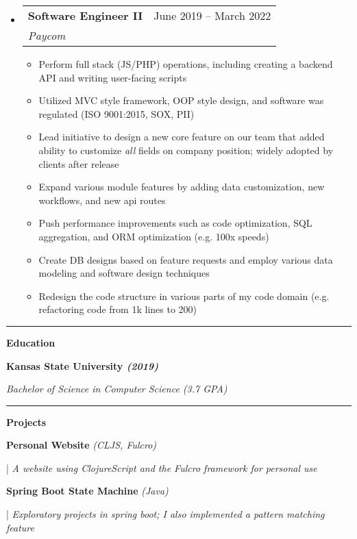 \documentclass[letterpaper,11pt]{article}
\makeatletter
\newcommand{\resumeItem}[1]{
  \item\small{
    {#1 \vspace{-2pt}}
  }
}
\newcommand{\resumeSubheading}[4]{
  \vspace{-2pt}\item
    \begin{tabular*}{0.97\textwidth}[t]{l@{\extracolsep{\fill}}r}
      \textbf{#1} & #2 \\
      \textit{\small#3} & \textit{\small #4} \\
    \end{tabular*}\vspace{0pt}
}
\newcommand{\resumeSubHeadingListStart}{\begin{itemize}[leftmargin=0.15cm, label={}]}
\newcommand{\resumeSubHeadingListEnd}{\end{itemize}}
\newcommand{\resumeItemListStart}{\begin{itemize}}
\newcommand{\resumeItemListEnd}{\end{itemize}\vspace{-5pt}}
\makeatother
\begin{document}
\resumeSubHeadingListStart
\resumeSubheading
{Software Engineer II}{ June 2019 – March 2022}
{Paycom}{}
\resumeItemListStart
\resumeItem{Perform full stack (JS/PHP) operations, including creating a backend API and writing user-facing scripts}
\resumeItem{Utilized MVC style framework, OOP style design, and software was regulated (ISO 9001:2015, SOX, PII)}
\resumeItem{Lead initiative to design a new core feature on our team that added ability to customize \textit{all} fields on company position; widely adopted by clients after release }
\resumeItem{Expand various module features by adding data customization, new workflows, and new api routes}
\resumeItem{Push performance improvements such as code optimization, SQL aggregation, and ORM optimization (e.g. 100x speeds)}
\resumeItem{Create DB designs based on feature requests and employ various data modeling and software design techniques}
\resumeItem{Redesign the code structure in various parts of my code domain (e.g. refactoring code from 1k lines to 200)}
\resumeItemListEnd
\resumeSubHeadingListEnd
\noindent\rule{19.5cm}{0.4pt}

\textbf{\large \textcolor{magic_blue}{Education}}

\begin{minipage}[t]{0.45\textwidth}
	\raggedright
	\textbf{ Kansas State University \textit{(2019)}} \\
\end{minipage}
\hfill
\begin{minipage}[t]{0.45\textwidth}
	\raggedleft
	\textit{Bachelor of Science in Computer Science (3.7 GPA)} \\
\end{minipage}
\noindent\rule{19.5cm}{0.4pt}

\textbf{\large \textcolor{magic_blue}{Projects}}

\begin{minipage}[t]{0.28\textwidth}
	\raggedright
	\textbf{ Personal Website }\textit{(CLJS, Fulcro)} \\
\end{minipage}
\hfill
\begin{minipage}[t]{0.70\textwidth}
	\raggedright
	|\textit{ A website using ClojureScript and the Fulcro framework for personal use} \\
\end{minipage}

\begin{minipage}[t]{0.28\textwidth}
	\raggedright
	\textbf{ Spring Boot State Machine }\textit{(Java)} \\
\end{minipage}
\hfill
\begin{minipage}[t]{0.70\textwidth}
	\raggedright
	|\textit{ Exploratory projects in spring boot; I also implemented a pattern matching feature } \\
\end{minipage}
\end{document}
